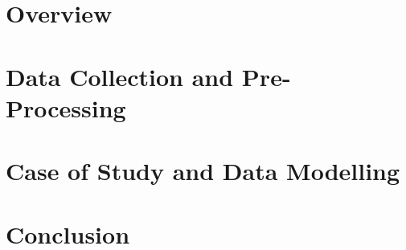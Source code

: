 \documentclass[fontsize=12pt,paper=a4,pagesize=auto]{report}
\begin{document}
\chapter{Overview}
 \label{chap:Overview}
 

\chapter{Data Collection and Pre-Processing}
 \label{chap:pre}


\chapter{Case of Study and Data Modelling }
 \label{chap:case}


\chapter{Conclusion}




       
\end{document}
